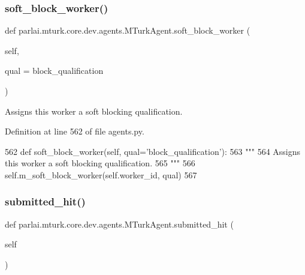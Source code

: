 \subsubsection{\texorpdfstring{soft\+\_\+block\+\_\+worker()}{soft\_block\_worker()}}
{\footnotesize\ttfamily def parlai.\+mturk.\+core.\+dev.\+agents.\+M\+Turk\+Agent.\+soft\+\_\+block\+\_\+worker (\begin{DoxyParamCaption}\item[{}]{self,  }\item[{}]{qual = {\ttfamily \textquotesingle{}block\+\_\+qualification\textquotesingle{}} }\end{DoxyParamCaption})}

\begin{DoxyVerb}Assigns this worker a soft blocking qualification.
\end{DoxyVerb}
 

Definition at line 562 of file agents.\+py.


\begin{DoxyCode}
562     \textcolor{keyword}{def }soft\_block\_worker(self, qual='block\_qualification'):
563         \textcolor{stringliteral}{"""}
564 \textcolor{stringliteral}{        Assigns this worker a soft blocking qualification.}
565 \textcolor{stringliteral}{        """}
566         self.m\_soft\_block\_worker(self.worker\_id, qual)
567 
\end{DoxyCode}
\mbox{\label{classparlai_1_1mturk_1_1core_1_1dev_1_1agents_1_1MTurkAgent_a6662232ebdd301d2547c2433cd0386f3}} 
\subsubsection{\texorpdfstring{submitted\+\_\+hit()}{submitted\_hit()}}
{\footnotesize\ttfamily def parlai.\+mturk.\+core.\+dev.\+agents.\+M\+Turk\+Agent.\+submitted\+\_\+hit (\begin{DoxyParamCaption}\item[{}]{self }\end{DoxyParamCaption})}



